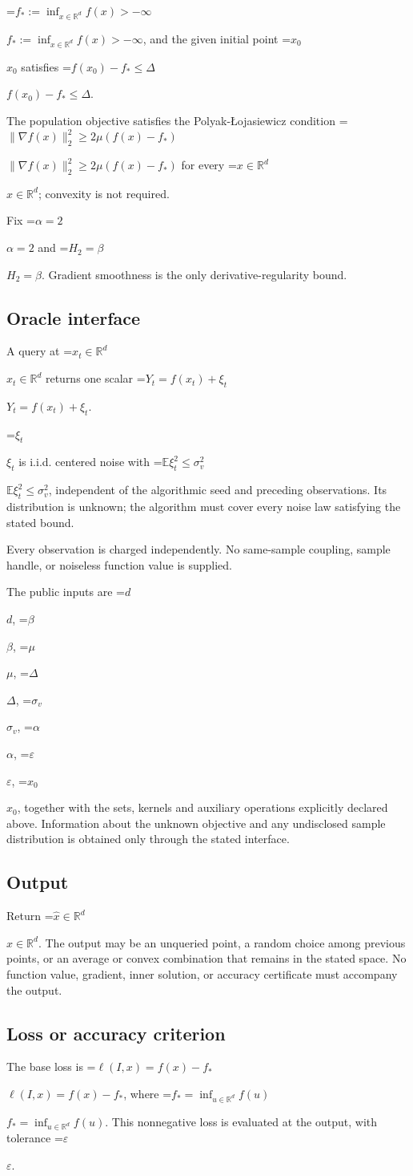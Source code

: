 \documentclass[10pt,a4paper]{article}
\newcommand{\AtlasMath}[1]{\par\begingroup\centering\setbox0=\hbox{$\displaystyle #1$}\ifdim\wd0>1.4\linewidth\typeout{ATLAS WIDE FORMULA: \the\wd0}\fi\ifdim\wd0>\linewidth\resizebox{\linewidth}{!}{\box0}\else\box0\fi\par\endgroup}
\newcommand{\AtlasInlineMath}[1]{\begingroup\setbox0=\hbox{$#1$}\ifdim\wd0>.4\linewidth\endgroup\AtlasMath{#1}\else\endgroup$#1$\fi}
\begin{document}
\AtlasInlineMath{f_*:=\inf_{x\in\mathbb{R}^d}f(x)>-\infty}, and the given initial point \AtlasInlineMath{x_0} satisfies \AtlasInlineMath{f(x_0)-f_*\le\Delta}.

The population objective satisfies the Polyak-Łojasiewicz condition \AtlasInlineMath{\|\nabla f(x)\|_2^2\ge2\mu(f(x)-f_*)} for every \AtlasInlineMath{x\in\mathbb{R}^d}; convexity is not required.

Fix \AtlasInlineMath{\alpha=2} and \AtlasInlineMath{H_2=\beta}. Gradient smoothness is the only derivative-regularity bound.

\subsection{Oracle interface}
A query at \AtlasInlineMath{x_t\in \mathbb{R}^d} returns one scalar \AtlasInlineMath{Y_t=f(x_t)+\xi_t}.

\AtlasInlineMath{\xi_t} is i.i.d. centered noise with \AtlasInlineMath{\mathbb{E}\xi_t^2\le\sigma_v^2}, independent of the algorithmic seed and preceding observations. Its distribution is unknown; the algorithm must cover every noise law satisfying the stated bound.

Every observation is charged independently. No same-sample coupling, sample handle, or noiseless function value is supplied.

The public inputs are \AtlasInlineMath{d}, \AtlasInlineMath{\beta}, \AtlasInlineMath{\mu}, \AtlasInlineMath{\Delta}, \AtlasInlineMath{\sigma_v}, \AtlasInlineMath{\alpha}, \AtlasInlineMath{\varepsilon}, \AtlasInlineMath{x_0}, together with the sets, kernels and auxiliary operations explicitly declared above. Information about the unknown objective and any undisclosed sample distribution is obtained only through the stated interface.

\subsection{Output}
Return \AtlasInlineMath{\widehat{x}\in \mathbb{R}^d}. The output may be an unqueried point, a random choice among previous points, or an average or convex combination that remains in the stated space. No function value, gradient, inner solution, or accuracy certificate must accompany the output.

\subsection{Loss or accuracy criterion}
The base loss is \AtlasInlineMath{\ell(I,x)=f(x)-f_*}, where \AtlasInlineMath{f_*=\inf_{u\in \mathbb{R}^d}f(u)}. This nonnegative loss is evaluated at the output, with tolerance \AtlasInlineMath{\varepsilon}.
\end{document}
